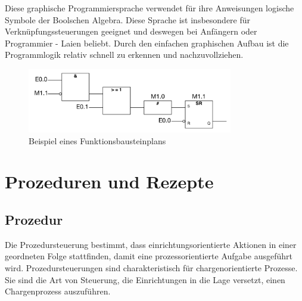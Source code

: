 	Diese graphische Programmiersprache verwendet für ihre Anweisungen logische Symbole der Boolschen Algebra. Diese Sprache ist insbesondere für Verknüpfungssteuerungen geeignet und deswegen bei Anfängern oder Programmier - Laien beliebt. Durch den einfachen graphischen Aufbau ist die Programmlogik relativ schnell zu erkennen und nachzuvollziehen.

	\begin{figure}[h!]
  		\centering
    	\includegraphics[width=0.8\textwidth]{graphics/stateoftheart/funktionsbausteinplan_Selfmade.png}
  		\caption{Beispiel eines Funktionsbausteinplans \cite{funktionsbausteinplan}}
	\end{figure}

\section{Prozeduren und Rezepte}
\subsection{Prozedur}
Die Prozedursteuerung bestimmt, dass einrichtungsorientierte Aktionen in einer geordneten Folge stattfinden, damit eine prozessorientierte Aufgabe ausgeführt wird. Prozedursteuerungen sind charakteristisch für chargenorientierte Prozesse. Sie sind die Art von Steuerung, die Einrichtungen in die Lage versetzt, einen Chargenprozess auszuführen.\\

